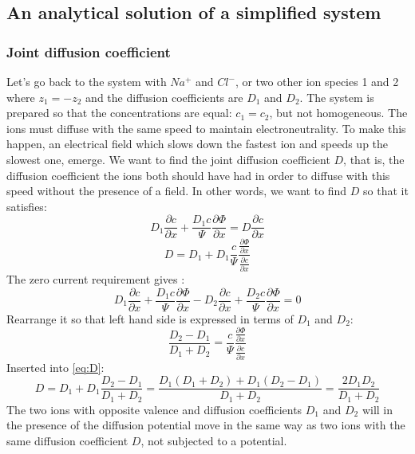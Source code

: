 \documentclass{article}
\begin{document}
\subsection{An analytical solution of a simplified system}
\subsubsection{Joint diffusion coefficient}\label{joint diffusion}
Let's go back to the system with $Na^+$ and $Cl^-$, or two other ion species 1 and 2 where $z_1 = -z_2$ and the diffusion coefficients are $D_1$ and $D_2$. The system is prepared so that the concentrations are equal: $c_1 = c_2$, but not homogeneous. The ions must diffuse with the same speed to maintain electroneutrality. To make this happen, an electrical field which slows down the fastest ion and speeds up the slowest one, emerge.  We want to find the joint diffusion coefficient $D$, that is, the diffusion coefficient the ions both should have had in order to diffuse with this speed without the presence of a field. In other words, we want to find $D$ so that it satisfies:
\begin{equation}
D_1 \frac{\partial c}{\partial x} + \frac{D_1 c}{\Psi}\frac{\partial \Phi}{\partial x} = D\frac{\partial c}{\partial x}
\end{equation} 
\begin{equation}\label{eq:D}
D = D_1 + D_1 \frac{c}{\Psi}\frac{\frac{\partial \Phi}{\partial x}}{\frac{\partial c}{\partial x}}
\end{equation}
The zero current requirement gives :
\begin{equation}
D_1 \frac{\partial c}{\partial x} + \frac{D_1 c}{\Psi}\frac{\partial \Phi}{\partial x} - D_2 \frac{\partial c}{\partial x} + \frac{D_2 c}{\Psi}\frac{\partial \Phi}{\partial x} = 0
\end{equation}
Rearrange it so that left hand side is expressed in terms of $D_1$ and $D_2$:
\begin{equation}
\frac{D_2 - D_1}{D_1 + D_2} = \frac{c}{\Psi}\frac{\frac{\partial \Phi}{\partial x}}{\frac{\partial c}{\partial x}}
\end{equation}
Inserted into \ref{eq:D}: 
\begin{equation}
D = D_1 +D_1 \frac{D_2 - D_1}{D_1 + D_2} = \frac{D_1(D_1 + D_2)+D_1(D_2-D_1)}{D_1+D_2} = \frac{2D_1D_2}{D_1+D_2}
\end{equation}
The two ions with opposite valence and diffusion coefficients $D_1$ and $D_2$ will in the presence of the diffusion potential move in the same way as two ions with the same diffusion coefficient $D$, not subjected to a potential. 
\end{document}
